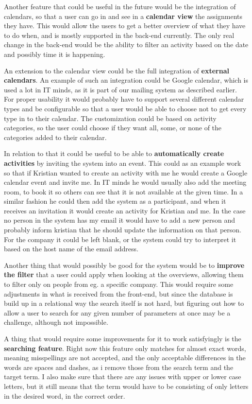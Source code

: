 Another feature that could be useful in the future would be the integration of
calendars, so that a user can go in and see in a \textbf{calendar view} the assignments
they have. This would allow the users to get a better overview of what they have
to do when, and is mostly supported in the back-end currently. The only real
change in the back-end would be the ability to filter an activity based on the
date and possibly time it is happening.

An extension to the calendar view could be the full integration of \textbf{external
calendars}. An example of such an integration could be Google calendar, which is
used a lot in IT minds, as it is part of our mailing system as described
earlier. For proper usability it would probably have to support several
different calendar types and be configurable so that a user would be able to
choose not to get every type in to their calendar. The customization could be
based on activity categories, so the user could choose if they want all, some,
or none of the categories added to their calendar.

In relation to that it could be useful to be able to \textbf{automatically create
activities} by inviting the system into an event. This could as an example work
so that if Kristian wanted to create an activity with me he would create a
Google calendar event and invite me. In IT minds he would usually also add the
meeting room, to book it so others can see that it is not available at the given
time. In a similar fashion he could then add the system as a participant, and
when it receives an invitation it would create an activity for Kristian and me.
In the case no person in the system has my email it would have to add a new
person and probably inform kristian that he should update the information on
that person. For the company it could be left blank, or the system could try to
interpret it based on the host name of the email address.

Another thing that would possibly be good for the system would  be to \textbf{improve
the filter} that a user could apply when looking at the overviews, allowing them
to filter only on people from eg. a specific company. This would require some
adjustments in what is received from the front-end, but since the database is
build up in a relational way the search itself is not hard, but figuring out how
to allow a user to search for any given number of parameters at once may be a
challenge, although not impossible.

A thing that would require some improvements for it to work satisfyingly is the
\textbf{searching feature}. Right now this feature only matches for almost exact words,
meaning misspellings are not accepted, and the only acceptable differences in
the words are spaces and dashes, as i remove those from the search term and the
target term. I also make sure that there are any issues with upper or lower case
letters, but it still means that the term would have to be consisting of only
letters in the desired word, in the correct order.


